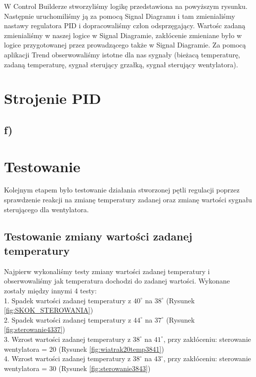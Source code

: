 \documentclass[12pt, a4paper]{article}
\begin{document}
W Control Builderze stworzyliśmy logikę przedstawiona na powyższym rysunku. Następnie uruchomiliśmy ją za pomocą Signal Diagramu i tam zmienialiśmy nastawy regulatora PID i dopracowaliśmy człon odsprzęgający. Wartośc zadaną zmienialiśmy w naszej logice w Signal Diagramie, zakłócenie zmieniane było w logice przygotowanej przez prowadzącego także w Signal Diagramie. Za pomocą aplikacji Trend obserwowaliśmy istotne dla nas sygnały (bieżacą temperaturę, zadaną temperaturę, sygnał sterujący grzałką, sygnał sterujący wentylatora).

\section{Strojenie PID}

\subsection{f) }
\begin{figure}[h!]
\end{figure}
\newpage
\section{Testowanie}
Kolejnym etapem było testowanie działania stworzonej pętli regulacji poprzez sprawdzenie reakcji na zmianę temperatury zadanej oraz zmianę wartości sygnału sterującego dla wentylatora. 

\subsection{Testowanie zmiany wartości zadanej temperatury}
Najpierw wykonaliśmy testy zmiany wartości zadanej temperatury i obserwowaliśmy jak temperatura dochodzi do zadanej wartości. Wykonane zostały między innymi 4 testy: \\
1. Spadek wartości zadanej temperatury z  $40^\circ$ na $38^\circ$ (Rysunek \ref{fig:SKOK_STEROWANIA}) \\
2. Spadek wartości zadanej temperatury z  $44^\circ$ na $37^\circ$ (Rysunek \ref{fig:sterowanie4337}) \\
3. Wzrost wartości zadanej temperatury z  $38^\circ$ na $41^\circ$, przy zakłóceniu: sterowanie wentylatora = 20 (Rysunek \ref{fig:wiatrak20temp3841}) \\
4. Wzrost wartości zadanej temperatury z  $38^\circ$ na $43^\circ$, przy zakłóceniu: sterowanie wentylatora = 30  (Rysunek \ref{fig:sterowanie3843}) \\
\end{document}
